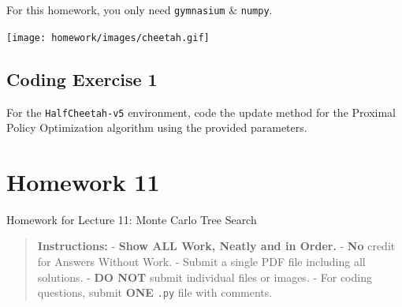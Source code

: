 \documentclass[
  letterpaper,
  DIV=11,
  numbers=noendperiod]{scrreprt}
\makeatletter
\newcommand*\pandocbounded[1]{%
  \sbox\pandoc@box{#1}%
  \Gscale@div\@tempa{\textheight}{\dimexpr\ht\pandoc@box+\dp\pandoc@box\relax}%
  \Gscale@div\@tempb{\linewidth}{\wd\pandoc@box}%
  \ifdim\@tempb\p@<\@tempa\p@\let\@tempa\@tempb\fi%
  \ifdim\@tempa\p@<\p@\scalebox{\@tempa}{\usebox\pandoc@box}%
  \else\usebox{\pandoc@box}%
  \fi%
}
\makeatother
\begin{document}
\begin{tcolorbox}[enhanced jigsaw, toprule=.15mm, leftrule=.75mm, coltitle=black, left=2mm, opacityback=0, titlerule=0mm, arc=.35mm, toptitle=1mm, opacitybacktitle=0.6, bottomtitle=1mm, colframe=quarto-callout-note-color-frame, title=\textcolor{quarto-callout-note-color}{\faInfo}\hspace{0.5em}{Note}, rightrule=.15mm, bottomrule=.15mm, colbacktitle=quarto-callout-note-color!10!white, breakable, colback=white]

For this homework, you only need \texttt{gymnasium} \& \texttt{numpy}.

\end{tcolorbox}

\begin{center}
\texttt{[image: homework/images/cheetah.gif]}
\end{center}

\section{Coding Exercise 1}\label{coding-exercise-1-7}

For the \texttt{HalfCheetah-v5} environment, code the update method for
the Proximal Policy Optimization algorithm using the provided
parameters.

\section{\texorpdfstring{\href{https://colab.research.google.com/drive/1Y_A4uKoSmjc6EmU-Or7tbeo3fe_ZD4RH?usp=sharing}{\protect\pandocbounded{}}}{}}\label{section-8}

\chapter{Homework 11}\label{homework-11}

\begin{tcolorbox}[enhanced jigsaw, arc=.35mm, toprule=.15mm, leftrule=.75mm, colback=white, left=2mm, colframe=quarto-callout-note-color-frame, rightrule=.15mm, opacityback=0, breakable, bottomrule=.15mm]

Homework for Lecture 11: Monte Carlo Tree Search 📝

\end{tcolorbox}

\begin{quote}
\textbf{Instructions:} - \textbf{Show ALL Work, Neatly and in Order.} -
\textbf{No} credit for Answers Without Work. - Submit a single PDF file
including all solutions. - \textbf{DO NOT} submit individual files or
images. - For coding questions, submit \textbf{ONE} \texttt{.py} file
with comments.
\end{quote}
\end{document}
